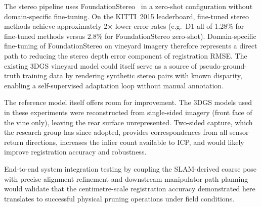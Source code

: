 The stereo pipeline uses FoundationStereo~\cite{wenFoundationStereoZeroShot2025} in a zero-shot configuration without domain-specific fine-tuning. On the KITTI~2015 leaderboard, fine-tuned stereo methods achieve approximately 2$\times$ lower error rates (e.g.\ D1-all of 1.28\% for fine-tuned methods versus 2.8\% for FoundationStereo zero-shot). Domain-specific fine-tuning of FoundationStereo on vineyard imagery therefore represents a direct path to reducing the stereo depth error component of registration RMSE. The existing 3DGS vineyard model could itself serve as a source of pseudo-ground-truth training data by rendering synthetic stereo pairs with known disparity, enabling a self-supervised adaptation loop without manual annotation.

The reference model itself offers room for improvement. The 3DGS models used in these experiments were reconstructed from single-sided imagery (front face of the vine only), leaving the rear surface unrepresented. Two-sided capture, which the research group has since adopted, provides correspondences from all sensor return directions, increases the inlier count available to ICP, and would likely improve registration accuracy and robustness.

End-to-end system integration testing by coupling the SLAM-derived coarse pose with precise-alignment refinement and downstream manipulator path planning would validate that the centimetre-scale registration accuracy demonstrated here translates to successful physical pruning operations under field conditions.
